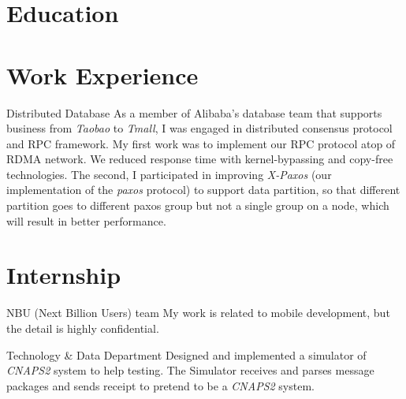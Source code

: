 \documentclass[11pt,a4paper]{moderncv}
\begin{document}
\makecvtitle

\section{Education}


\section{Work Experience}
{Distributed Database}
{}{}{
	As a member of Alibaba's database team that supports business from \textit{Taobao} to \textit{Tmall}, I was engaged in distributed consensus protocol and RPC framework. My first work was to implement our RPC protocol atop of RDMA network. We reduced response time with kernel-bypassing and copy-free technologies. The second, I participated in improving \textit{X-Paxos} (our implementation of the \textit{paxos} protocol) to support data partition, so that different partition goes to different paxos group but not a single group on a node, which will result in better performance.
}

\section{Internship}
{NBU (Next Billion Users) team}
{}{}{
	My work is related to mobile development, but the detail is highly confidential.
}

{Technology \& Data Department}
{}{}{
	Designed and implemented a simulator of \textsl{CNAPS2} system to help testing.
	The Simulator receives and parses message packages and sends receipt
	to pretend to be a \textsl{CNAPS2} system.
}
\end{document}
